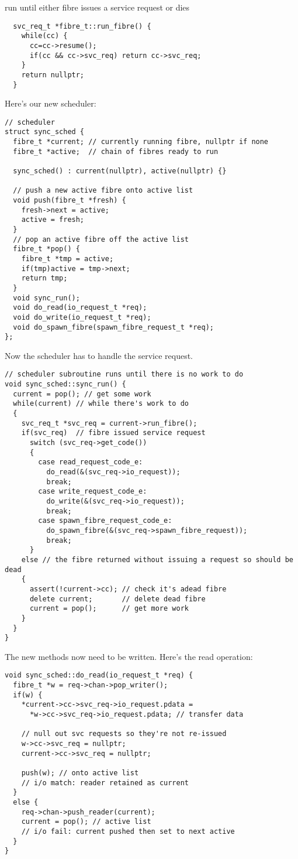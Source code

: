 \documentclass[oneside]{book}
\begin{document}
run until either fibre issues a service request or dies

\begin{verbatim}
  svc_req_t *fibre_t::run_fibre() { 
    while(cc) {
      cc=cc->resume(); 
      if(cc && cc->svc_req) return cc->svc_req;
    }
    return nullptr;
  }
\end{verbatim}

Here's our new scheduler:

\begin{verbatim}
// scheduler
struct sync_sched {
  fibre_t *current; // currently running fibre, nullptr if none
  fibre_t *active;  // chain of fibres ready to run

  sync_sched() : current(nullptr), active(nullptr) {}

  // push a new active fibre onto active list
  void push(fibre_t *fresh) { 
    fresh->next = active; 
    active = fresh; 
  }
  // pop an active fibre off the active list
  fibre_t *pop() {
    fibre_t *tmp = active;
    if(tmp)active = tmp->next;
    return tmp;
  }
  void sync_run();
  void do_read(io_request_t *req);
  void do_write(io_request_t *req);
  void do_spawn_fibre(spawn_fibre_request_t *req);
};
\end{verbatim}

Now the scheduler has to handle the service request.

\begin{verbatim}
// scheduler subroutine runs until there is no work to do
void sync_sched::sync_run() {
  current = pop(); // get some work
  while(current) // while there's work to do 
  {
    svc_req_t *svc_req = current->run_fibre();
    if(svc_req)  // fibre issued service request
      switch (svc_req->get_code()) 
      {
        case read_request_code_e: 
          do_read(&(svc_req->io_request));
          break;
        case write_request_code_e:  
          do_write(&(svc_req->io_request));
          break;
        case spawn_fibre_request_code_e:  
          do_spawn_fibre(&(svc_req->spawn_fibre_request));
          break;
      }
    else // the fibre returned without issuing a request so should be dead
    {
      assert(!current->cc); // check it's adead fibre
      delete current;       // delete dead fibre
      current = pop();      // get more work
    }
  }
}
\end{verbatim}

The new methods now need to be written. Here's the read operation:

\begin{verbatim}
void sync_sched::do_read(io_request_t *req) {
  fibre_t *w = req->chan->pop_writer();
  if(w) {
    *current->cc->svc_req->io_request.pdata =
      *w->cc->svc_req->io_request.pdata; // transfer data

    // null out svc requests so they're not re-issued
    w->cc->svc_req = nullptr;
    current->cc->svc_req = nullptr;

    push(w); // onto active list
    // i/o match: reader retained as current
  }
  else {
    req->chan->push_reader(current);
    current = pop(); // active list
    // i/o fail: current pushed then set to next active
  }
}

\end{verbatim}
\end{document}
